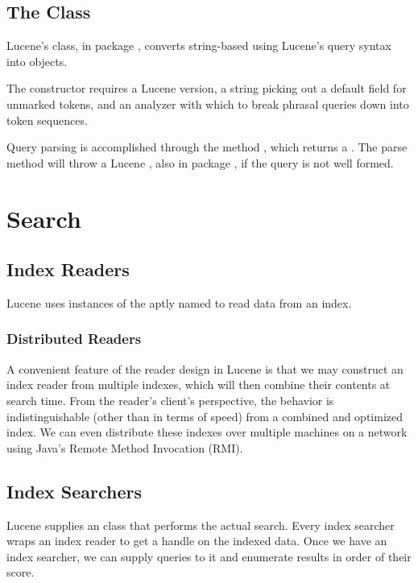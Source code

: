 \subsection{The  Class}

Lucene's  class, in package
, converts string-based using
Lucene's query syntax into  objects.  

The constructor  requires a
Lucene version, a string picking out a default field for unmarked
tokens, and an analyzer with which to break phrasal queries down into
token sequences.  

Query parsing is accomplished through the method ,
which returns a .  The parse method will throw a
Lucene , also in package , if
the query is not well formed.


\section{Search}

\subsection{Index Readers}

Lucene uses instances of the aptly named  to
read data from an index.

\subsubsection{Distributed Readers}

A convenient feature of the reader design in Lucene is that we may
construct an index reader from multiple indexes, which will then
combine their contents at search time.  From the reader's client's
perspective, the behavior is indistinguishable (other than in terms of
speed) from a combined and optimized index.  We can even distribute
these indexes over multiple machines on a network using Java's Remote
Method Invocation (RMI).


\subsection{Index Searchers}

Lucene supplies an  class that performs the actual
search.  Every index searcher wraps an index reader to get a handle
on the indexed data.  Once we have an index searcher, we can supply
queries to it and enumerate results in order of their score.

